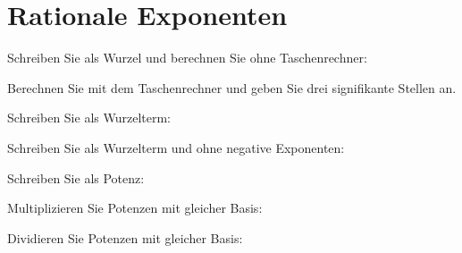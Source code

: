 
\newpage
\section{Rationale Exponenten}

Schreiben Sie als Wurzel und berechnen Sie ohne Taschenrechner:


Berechnen Sie mit dem Taschenrechner und geben Sie drei signifikante
Stellen an.


\noTRAINER{\newpage}


Schreiben Sie als Wurzelterm:




\noTRAINER{\newpage}

\noTRAINER{\newpage}

Schreiben Sie als Wurzelterm und ohne negative Exponenten:




\noTRAINER{\newpage}

Schreiben Sie als Potenz:



\noTRAINER{\newpage}
Multiplizieren Sie Potenzen mit gleicher Basis:



\noTRAINER{\newpage}
Dividieren Sie Potenzen mit gleicher Basis:

